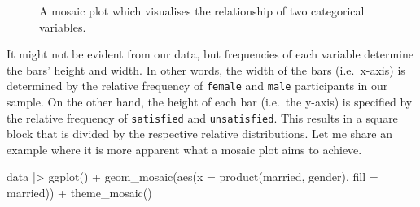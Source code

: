 \documentclass[
  letterpaper,
  DIV=11,
  numbers=noendperiod]{scrreprt}
\newenvironment{Shaded}{\begin{snugshade}}{\end{snugshade}}
\newcommand{\AttributeTok}[1]{\textcolor[rgb]{0.40,0.45,0.13}{#1}}
\newcommand{\FunctionTok}[1]{\textcolor[rgb]{0.28,0.35,0.67}{#1}}
\newcommand{\NormalTok}[1]{\textcolor[rgb]{0.00,0.23,0.31}{#1}}
\newcommand{\SpecialCharTok}[1]{\textcolor[rgb]{0.37,0.37,0.37}{#1}}
\begin{document}
\begin{figure}[H]


\caption{\label{fig-mosaic-plot}A mosaic plot which visualises the
relationship of two categorical variables.}

\end{figure}%

It might not be evident from our data, but frequencies of each variable
determine the bars' height and width. In other words, the width of the
bars (i.e.~x-axis) is determined by the relative frequency of
\texttt{female} and \texttt{male} participants in our sample. On the
other hand, the height of each bar (i.e.~the y-axis) is specified by the
relative frequency of \texttt{satisfied} and \texttt{unsatisfied}. This
results in a square block that is divided by the respective relative
distributions. Let me share an example where it is more apparent what a
mosaic plot aims to achieve.

\begin{Shaded}
\begin{Highlighting}[]
\NormalTok{data }\SpecialCharTok{|\textgreater{}}
  \FunctionTok{ggplot}\NormalTok{() }\SpecialCharTok{+}
  \FunctionTok{geom\_mosaic}\NormalTok{(}\FunctionTok{aes}\NormalTok{(}\AttributeTok{x =} \FunctionTok{product}\NormalTok{(married, gender),}
                  \AttributeTok{fill =}\NormalTok{ married)) }\SpecialCharTok{+}
  \FunctionTok{theme\_mosaic}\NormalTok{()}
\end{Highlighting}
\end{Shaded}
\end{document}
